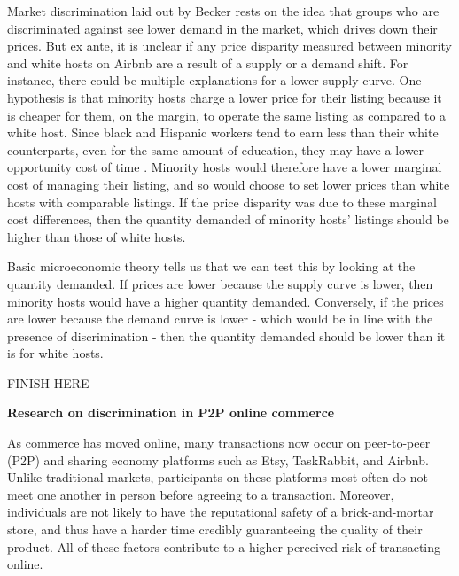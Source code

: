 Market discrimination laid out by Becker rests on the idea that groups who are discriminated against see lower demand in the market, which drives down their prices. But ex ante, it is unclear if any price disparity measured between minority and white hosts on Airbnb are a result of a supply or a demand shift. For instance, there could be multiple explanations for a lower supply curve. One hypothesis is that minority hosts charge a lower price for their listing because it is cheaper for them, on the margin, to operate the same listing as compared to a white host. Since black and Hispanic workers tend to earn less than their white counterparts, even for the same amount of education, they may have a lower opportunity cost of time \citep{wages}. Minority hosts would therefore have a lower marginal cost of managing their listing, and so would choose to set lower prices than white hosts with comparable listings. If the price disparity was due to these marginal cost differences, then the quantity demanded of minority hosts' listings should be higher than those of white hosts. 

Basic microeconomic theory tells us that we can test this by looking at the quantity demanded. If prices are lower because the supply curve is lower, then minority hosts would have a higher quantity demanded. Conversely, if the prices are lower because the demand curve is lower - which would be in line with the presence of discrimination - then the quantity demanded should be lower than it is for white hosts. 

FINISH HERE


\textbf{Research on discrimination in P2P online commerce}

As commerce has moved online, many transactions now occur on peer-to-peer (P2P) and sharing economy platforms such as Etsy, TaskRabbit, and Airbnb. Unlike traditional markets, participants on these platforms most often do not meet one another in person before agreeing to a transaction. Moreover, individuals are not likely to have the reputational safety of a brick-and-mortar store, and thus have a harder time credibly guaranteeing the quality of their product. All of these factors contribute to a higher perceived risk of transacting online. 

